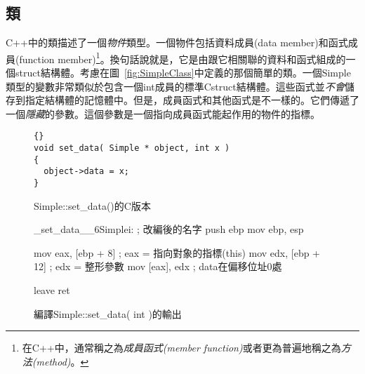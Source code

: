 \subsection{類}

C++中的類描述了一個\emph{物件}類型。一個物件包括資料成員(data member)和函式成員(function member)\footnote{在C++中，通常稱之為\emph{成員函式(member
function)}或者更為普遍地稱之為\emph{方法(method)}。}。換句話說就是，它是由跟它相關聯的資料和函式組成的一個{\code struct}結構體。考慮在圖~\ref{fig:SimpleClass}中定義的那個簡單的類。一個{\code Simple}類型的變數非常類似於包含一個{\code int}成員的標準C{\code struct}結構體。這些函式並\emph{不會}儲存到指定結構體的記憶體中。但是，成員函式和其他函式是不一樣的。它們傳遞了一個\emph{隱藏}的參數。這個參數是一個指向成員函式能起作用的物件的指標。

\begin{figure}[t]
\begin{lstlisting}[stepnumber=0]{}
void set_data( Simple * object, int x )
{
  object->data = x;
}
\end{lstlisting}
\caption{Simple::set\_data()的C版本\label{fig:SimpleCVer}}
\end{figure}


\begin{figure}[t]
\begin{AsmCodeListing}
_set_data__6Simplei:           ; 改編後的名字
      push   ebp
      mov    ebp, esp

      mov    eax, [ebp + 8]   ; eax = 指向對象的指標(this)
      mov    edx, [ebp + 12]  ; edx = 整形參數
      mov    [eax], edx       ; data在偏移位址0處

      leave
      ret
\end{AsmCodeListing}
\caption{編譯Simple::set\_data( int )的輸出 \label{fig:SimpleAsm}}
\end{figure}


